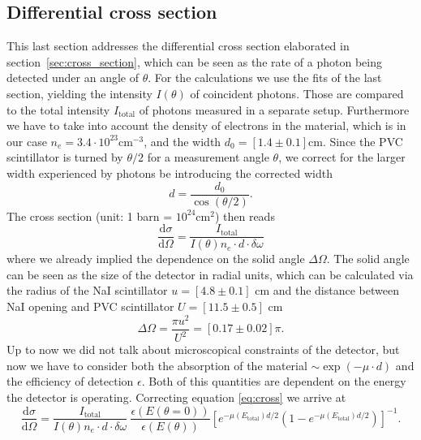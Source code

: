 \subsection{Differential cross section}
\label{sub:cross_section}
This last section addresses the differential cross section elaborated in section~\ref{sec:cross_section}, which can
be seen as the rate of a photon being detected under an angle of $\theta$. 
For the calculations we use the fits of the last section, yielding the intensity $I(\theta)$ 
of coincident photons. Those are compared to the total intensity $I_\mathrm{total}$ of photons
measured in a separate setup. Furthermore we have to take into account the density of
electrons in the material, which is in our case $n_e= 3.4\cdot10^{23}\mathrm{cm}^{-3}$, 
and the width $d_0 = [1.4 \pm 0.1]$cm. Since the PVC scintillator is turned by $\theta / 2$ for 
a measurement angle $\theta$, we correct for the larger width experienced 
by photons be introducing the corrected width
\begin{equation}
    d = \frac{d_0}{\cos(\theta / 2)} .
    \label{eq:width}
\end{equation}
The cross section (unit: 1 barn = $10^{24}\mathrm{cm}^{2}$) then reads
\begin{equation}
    \label{eq:cross}
    \frac{\mathrm{d}\sigma}{\mathrm{d} \Omega} = \frac{I_\mathrm{total}}{I(\theta) n_e \cdot d \cdot \delta \omega}
\end{equation}
where we already implied the dependence on the solid angle $\Delta \Omega$. The solid angle can be seen as the size of the
detector in radial units, which can be calculated via the radius of the NaI scintillator $u=[4.8\pm0.1]$ cm and the 
distance between NaI opening and PVC scintillator $U=[11.5\pm0.5]$ cm
\begin{equation}
    \Delta \Omega = \frac{\pi u^2}{U^2}  = [0.17 \pm 0.02] \pi.
\end{equation}
Up to now we did not talk about microscopical constraints of the detector, but now we have to consider both the absorption
of the material $\sim \exp(-\mu \cdot d)$ and the efficiency of detection $\epsilon$. Both of this quantities are 
dependent on the energy the detector is operating. Correcting equation \eqref{eq:cross} we arrive at
\begin{equation}
\label{eq:diff_cross}
    \frac{\mathrm{d} \sigma}{\mathrm{d} \Omega} = \frac{I_\mathrm{total}}{I(\theta) n_e \cdot d \cdot \delta \omega} \
    \frac{\epsilon(E(\theta = 0 ))}{\epsilon(E(\theta))} \left[ e^{-\mu(E_{\mathrm{total} }) d/2}
    \left( 1 - e^{-\mu(E_{\mathrm{total} }) d/2}  \right)\right]^{-1}.
\end{equation}
